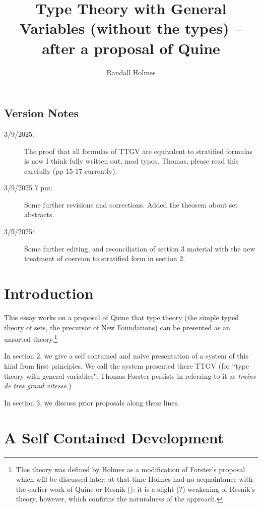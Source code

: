 \documentclass[12pt]{article}
\title{Type Theory with General Variables (without the types) -- after a proposal of Quine}
\author{Randall Holmes}
\begin{document}
\maketitle

\subsection{Version Notes}

\begin{description}

\item[3/9/2025:]  The proof that all formulas of TTGV are equivalent to stratified formulas is now I think fully written out, mod typos.  Thomas, please read this carefully (pp 15-17 currently).

\item[3/9/2025 7 pm:]  Some further revisions and corrections.  Added the theorem about set abstracts.

\item[3/9/2025:]  Some further editing, and reconciliation of section 3 material with the new treatment of coercion to stratified form in section 2.

\end{description}

\tableofcontents

\section{Introduction}

This essay works on a proposal of Quine that type theory (the simple typed theory of sets, the precursor of New Foundations) can be presented as an unsorted theory.\footnote{This theory was defined by Holmes as a modification of Forster's proposal which will be discussed later; at that time Holmes had no acquaintance with the earlier work of Quine or Resnik (\cite{resnikttgv}):  it is a slight (?) weakening of Resnik's theory, however, which confirms the naturalness of the approach.}

In section 2, we give a self contained and naive presentation of a system of this kind from first principles.  We call the system presented there TTGV (for ``type theory with general variables";  Thomas Forster persists in referring to it as {\em trains de tres grand vitesse\/}.)

In section 3, we discuss prior proposals along these lines.

\section{A Self Contained Development}
\end{document}
